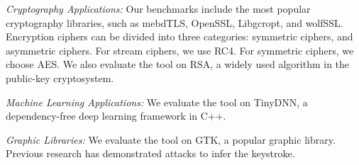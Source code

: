 \textit{Cryptography Applications:} Our benchmarks include the most popular cryptography libraries, such as mebdTLS, OpenSSL, Libgcropt, and wolfSSL. Encryption ciphers can be divided into three categories:  symmetric ciphers, and asymmetric ciphers. For stream ciphers, we use RC4. For symmetric ciphers, we choose AES. We also evaluate the tool on RSA, a widely used algorithm in the public-key cryptosystem.

\textit{Machine Learning Applications:} We evaluate the tool on TinyDNN, a dependency-free deep learning framework in C++.

\textit{Graphic Libraries:} We evaluate the tool on GTK, a popular graphic library. Previous research has demonstrated attacks to infer the keystroke.

\begin{table}
\footnotesize
\caption{Evaluation results overview: Name of the benchmark, The Size of the Input Data, The number of leaked functions, The Maximum Leakage, The size of the benchmark, and Performance.}\label{chapter5:table:over_result}
\centering
{}
\end{table}
